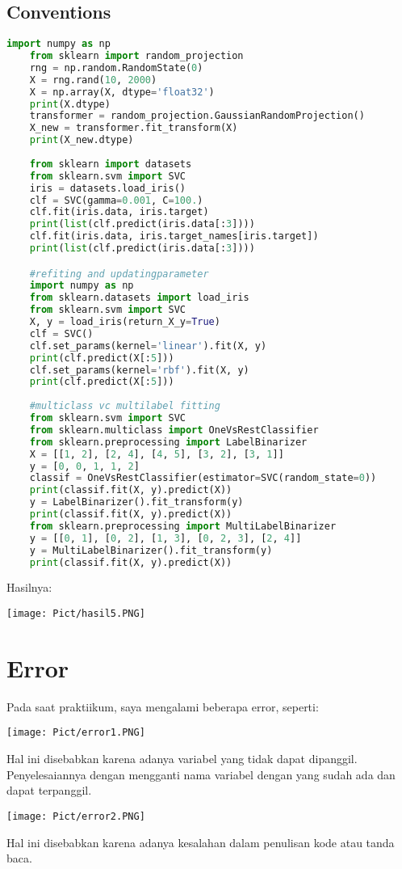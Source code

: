 \documentclass{homework}
\begin{document}
\subsection{Conventions}
\begin{lstlisting}[language=Python]
    import numpy as np
    from sklearn import random_projection
    rng = np.random.RandomState(0)
    X = rng.rand(10, 2000)
    X = np.array(X, dtype='float32')
    print(X.dtype)
    transformer = random_projection.GaussianRandomProjection()
    X_new = transformer.fit_transform(X)
    print(X_new.dtype)
    
    from sklearn import datasets
    from sklearn.svm import SVC
    iris = datasets.load_iris()
    clf = SVC(gamma=0.001, C=100.)
    clf.fit(iris.data, iris.target)
    print(list(clf.predict(iris.data[:3])))
    clf.fit(iris.data, iris.target_names[iris.target])
    print(list(clf.predict(iris.data[:3])))

    #refiting and updatingparameter
    import numpy as np
    from sklearn.datasets import load_iris
    from sklearn.svm import SVC
    X, y = load_iris(return_X_y=True)
    clf = SVC()
    clf.set_params(kernel='linear').fit(X, y)
    print(clf.predict(X[:5]))
    clf.set_params(kernel='rbf').fit(X, y)
    print(clf.predict(X[:5]))
    
    #multiclass vc multilabel fitting
    from sklearn.svm import SVC
    from sklearn.multiclass import OneVsRestClassifier
    from sklearn.preprocessing import LabelBinarizer
    X = [[1, 2], [2, 4], [4, 5], [3, 2], [3, 1]]
    y = [0, 0, 1, 1, 2]
    classif = OneVsRestClassifier(estimator=SVC(random_state=0))
    print(classif.fit(X, y).predict(X))
    y = LabelBinarizer().fit_transform(y)
    print(classif.fit(X, y).predict(X))
    from sklearn.preprocessing import MultiLabelBinarizer
    y = [[0, 1], [0, 2], [1, 3], [0, 2, 3], [2, 4]]
    y = MultiLabelBinarizer().fit_transform(y)
    print(classif.fit(X, y).predict(X))
\end{lstlisting}
Hasilnya:
\begin{center}
    \texttt{[image: Pict/hasil5.PNG]}
\end{center}

\section{Error}
Pada saat praktiikum, saya mengalami beberapa error, seperti:
\begin{center}
    \texttt{[image: Pict/error1.PNG]}
\end{center}
Hal ini disebabkan karena adanya variabel yang tidak dapat dipanggil. Penyelesaiannya dengan mengganti nama variabel dengan yang sudah ada dan dapat terpanggil.
\begin{center}
    \texttt{[image: Pict/error2.PNG]}
\end{center}
Hal ini disebabkan karena adanya kesalahan dalam penulisan kode atau tanda baca. 
\end{document}
